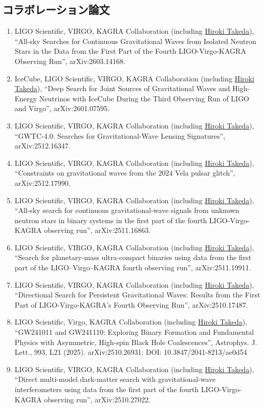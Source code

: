 \documentclass[uplatex, 11pt]{jsarticle}
\begin{document}
\subsection*{コラボレーション論文}
\begin{enumerate}
\item LIGO Scientific, VIRGO, KAGRA Collaboration (including \uline{Hiroki Takeda}), “All-sky Searches for Continuous Gravitational Waves from Isolated Neutron Stars in the Data from the First Part of the Fourth LIGO-Virgo-KAGRA Observing Run”, arXiv:2603.14168.
\item IceCube, LIGO Scientific, VIRGO, KAGRA Collaboration (including \uline{Hiroki Takeda}), “Deep Search for Joint Sources of Gravitational Waves and High-Energy Neutrinos with IceCube During the Third Observing Run of LIGO and Virgo”, arXiv:2601.07595.
\item LIGO Scientific, VIRGO, KAGRA Collaboration (including \uline{Hiroki Takeda}), “GWTC-4.0: Searches for Gravitational-Wave Lensing Signatures”, arXiv:2512.16347.
\item LIGO Scientific, VIRGO, KAGRA Collaboration (including \uline{Hiroki Takeda}), “Constraints on gravitational waves from the 2024 Vela pulsar glitch”, arXiv:2512.17990.
\item LIGO Scientific, VIRGO, KAGRA Collaboration (including \uline{Hiroki Takeda}), “All-sky search for continuous gravitational-wave signals from unknown neutron stars in binary systems in the first part of the fourth LIGO-Virgo-KAGRA observing run”, arXiv:2511.16863.
\item LIGO Scientific, VIRGO, KAGRA Collaboration (including \uline{Hiroki Takeda}), “Search for planetary-mass ultra-compact binaries using data from the first part of the LIGO--Virgo--KAGRA fourth observing run”, arXiv:2511.19911.
\item LIGO Scientific, VIRGO, KAGRA Collaboration (including \uline{Hiroki Takeda}), “Directional Search for Persistent Gravitational Waves: Results from the First Part of LIGO-Virgo-KAGRA's Fourth Observing Run”, arXiv:2510.17487.
\item LIGO Scientific, Virgo, KAGRA Collaboration (including \uline{Hiroki Takeda}), “GW241011 and GW241110: Exploring Binary Formation and Fundamental Physics with Asymmetric, High-spin Black Hole Coalescences”, Astrophys. J. Lett., 993, L21 (2025). arXiv:2510.26931; DOI: 10.3847/2041-8213/ae0d54
\item LIGO Scientific, VIRGO, KAGRA Collaboration (including \uline{Hiroki Takeda}), “Direct multi-model dark-matter search with gravitational-wave interferometers using data from the first part of the fourth LIGO-Virgo-KAGRA observing run”, arXiv:2510.27022.

\end{enumerate}
\end{document}
